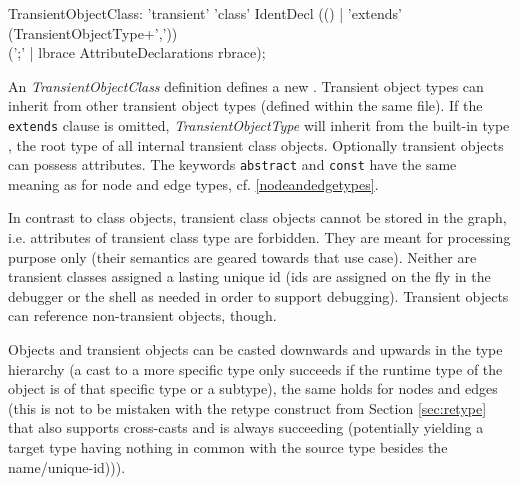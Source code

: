 \begin{rail}
  TransientObjectClass: 'transient' 'class' IdentDecl (() | 'extends' (TransientObjectType+',')) \\
    (';' | lbrace AttributeDeclarations rbrace);
\end{rail}
An \emph{TransientObjectClass} definition defines a new .
Transient object types can inherit from other transient object types (defined within the same file).
If the \texttt{extends} clause is omitted, \emph{TransientObjectType} will inherit from the built-in type \texttt{}, the root type of all internal transient class objects.
Optionally transient objects can possess attributes.
The keywords \texttt{abstract} and \texttt{const} have the same meaning as for node and edge types, cf. \ref{nodeandedgetypes}.

In contrast to class objects, transient class objects cannot be stored in the graph, i.e. attributes of transient class type are forbidden.
They are meant for processing purpose only (their semantics are geared towards that use case).
Neither are transient classes assigned a lasting unique id (ids are assigned on the fly in the debugger or the shell as needed in order to support debugging).
Transient objects can reference non-transient objects, though.

Objects and transient objects can be casted downwards and upwards in the type hierarchy (a cast to a more specific type only succeeds if the runtime type of the object is of that specific type or a subtype), the same holds for nodes and edges (this is not to be mistaken with the retype construct from Section \ref{sec:retype} that also supports cross-casts and is always succeeding (potentially yielding a target type having nothing in common with the source type besides the name/unique-id))).

